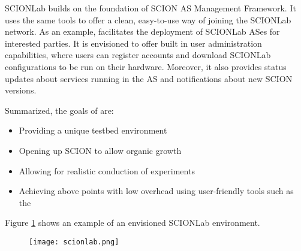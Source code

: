 SCIONLab builds on the foundation of SCION AS Management Framework. It uses the same tools to offer a clean, easy-to-use way of joining the SCIONLab network.
As an example, \lcs facilitates the deployment of SCIONLab ASes for interested parties. It is envisioned to offer built in user administration capabilities, where users can register accounts and download SCIONLab configurations to be run on their hardware. Moreover, it also provides status updates about services running in the AS and notifications about new SCION versions. \cite[Chapter~10]{scion_book}

Summarized, the goals of \lee are:
\begin{itemize}
	\item Providing a unique testbed environment
	\item Opening up SCION to allow organic growth
	\item Allowing for realistic conduction of experiments
	\item Achieving above points with low overhead using user-friendly tools such as the \lcs
\end{itemize}

Figure \ref{scionlab_figure} shows an example of an envisioned SCIONLab environment.

\begin{figure}
	\centering
	\centerline{\texttt{[image: scionlab.png]}}
	\label{scionlab_figure}
\end{figure}